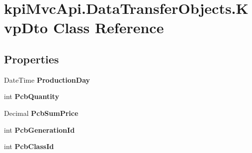 \hypertarget{classkpi_mvc_api_1_1_data_transfer_objects_1_1_kvp_dto}{}\section{kpi\+Mvc\+Api.\+Data\+Transfer\+Objects.\+Kvp\+Dto Class Reference}
\label{classkpi_mvc_api_1_1_data_transfer_objects_1_1_kvp_dto}
\subsection*{Properties}
\begin{DoxyCompactItemize}
\item 
\mbox{\label{classkpi_mvc_api_1_1_data_transfer_objects_1_1_kvp_dto_ac0ac5148dde5834357e9f65c7f5253ba}} 
Date\+Time {\bfseries Production\+Day}
\item 
\mbox{\label{classkpi_mvc_api_1_1_data_transfer_objects_1_1_kvp_dto_a7aad77f5196f2894c166e2e290e4aa16}} 
int {\bfseries Pcb\+Quantity}
\item 
\mbox{\label{classkpi_mvc_api_1_1_data_transfer_objects_1_1_kvp_dto_ad111027debe5c6186197f544d9776de8}} 
Decimal {\bfseries Pcb\+Sum\+Price}
\item 
\mbox{\label{classkpi_mvc_api_1_1_data_transfer_objects_1_1_kvp_dto_a3c8807c72349d95d0e5c7c5118aaefff}} 
int {\bfseries Pcb\+Generation\+Id}
\item 
\mbox{\label{classkpi_mvc_api_1_1_data_transfer_objects_1_1_kvp_dto_a677a6606cd7f6cc7fd56c5260a9e6130}} 
int {\bfseries Pcb\+Class\+Id}

\end{DoxyCompactItemize}
